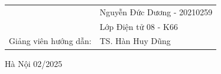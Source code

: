 \begin{titlepage}
\begin{center}
\begin{table}[H]
\begin{tabular}{l l}
				                                                      & \fontsize{14pt}{0pt}\selectfont Nguyễn Đức Dương - 20210259                  \\
				                                                      & \fontsize{14pt}{0pt}\selectfont Lớp Điện tử 08 - K66 \vspace{6pt}  \\
				\fontsize{14pt}{0pt}\selectfont Giảng viên hướng dẫn: & \fontsize{14pt}{0pt}\selectfont TS. Hàn Huy Dũng                   \\
			\end{tabular}
		\end{table}
		\vspace{1.3cm} %
		\fontsize{14pt}{0pt}\selectfont Hà Nội 02/2025
	\end{center}
\end{titlepage}

\cleardoublepage